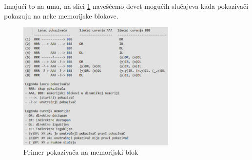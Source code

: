 \documentclass[12pt,oneside]{memoir}
\theoremstyle{plain}
\theoremstyle{definition}
\begin{document}
Imajući to na umu, na slici \ref{fig:slika2.12} navešćemo devet mogućih slučajeva kada pokazivači pokazuju na neke memorijske blokove.
\begin{figure}[!ht]
  \centering
  \includegraphics[width=0.7\textwidth]{memoryLeacking.png}
  \caption{Primer pokazivača na memorijski blok}
  \label{fig:slika2.12}
\end{figure}
\end{document}
